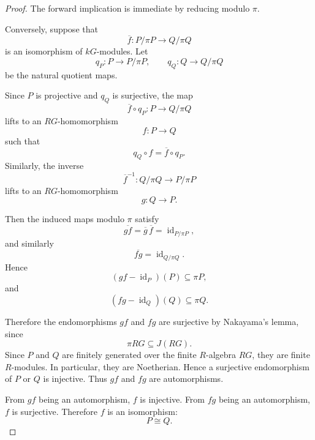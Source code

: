 \begin{proof}
    The forward implication is immediate by reducing modulo \(\pi\).

    Conversely, suppose that
    \[
        \overline{f}:P/\pi P\longrightarrow Q/\pi Q
    \]
    is an isomorphism of \(kG\)-modules. Let
    \[
        q_P:P\longrightarrow P/\pi P,
        \qquad
        q_Q:Q\longrightarrow Q/\pi Q
    \]
    be the natural quotient maps.

    Since \(P\) is projective and \(q_Q\) is surjective, the map
    \[
        \overline{f}\circ q_P:P\longrightarrow Q/\pi Q
    \]
    lifts to an \(RG\)-homomorphism
    \[
        f:P\longrightarrow Q
    \]
    such that
    \[
        q_Q\circ f=\overline{f}\circ q_P.
    \]
    Similarly, the inverse
    \[
        \overline{f}^{-1}:Q/\pi Q\longrightarrow P/\pi P
    \]
    lifts to an \(RG\)-homomorphism
    \[
        g:Q\longrightarrow P.
    \]

    Then the induced maps modulo \(\pi\) satisfy
    \[
        \overline{g f}
        =
        \overline{g}\,\overline{f}
        =
        \operatorname{id}_{P/\pi P},
    \]
    and similarly
    \[
        \overline{f g}
        =
        \operatorname{id}_{Q/\pi Q}.
    \]
    Hence
    \[
        (gf-\operatorname{id}_P)(P)\subseteq \pi P,
    \]
    and
    \[
        (fg-\operatorname{id}_Q)(Q)\subseteq \pi Q.
    \]

    Therefore the endomorphisms \(gf\) and \(fg\) are surjective by Nakayama's
    lemma, since
    \[
        \pi RG\subseteq J(RG).
    \]
    Since \(P\) and \(Q\) are finitely generated over the finite \(R\)-algebra \(RG\),
    they are finite \(R\)-modules. In particular, they are Noetherian. Hence a
    surjective endomorphism of \(P\) or \(Q\) is injective. Thus \(gf\) and \(fg\) are
    automorphisms.

    From \(gf\) being an automorphism, \(f\) is injective. From \(fg\) being an
    automorphism, \(f\) is surjective. Therefore \(f\) is an isomorphism:
    \[
        P\cong Q.
    \]
\end{proof}

